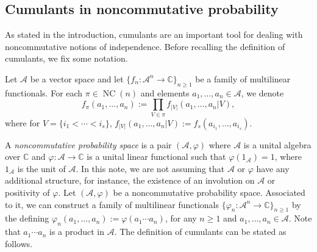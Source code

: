 \documentclass[pdftex]{sigma}%
\numberwithin{equation}{section}
\newcommand{\A}{\mathcal{A}}
\newcommand{\NC}{\operatorname{NC}}
\begin{document}
\subsection{Cumulants in noncommutative probability}\label{sec:cumulants}

As stated in the introduction, cumulants are an important tool for dealing with noncommutative notions of independence. Before recalling the definition of cumulants, we fix some notation.
\begin{Definition}
 Let $\A$ be a vector space and let $\{f_n\colon \A^n \to \mathbb{C}\}_{n\geq1}$ be a family of multilinear functionals. For each $\pi \in \NC(n)$ and elements $a_1,\dots,a_n \in \A$, we denote{\samepage
\[
	f_{\pi}(a_1,\dots,a_n) := \prod_{V \in \pi} f_{|V|}(a_1,\dots,a_n | V),
\]
where for $V = \{i_1 < \cdots < i_s\}$, $f_{|V|}(a_1,\dots,a_n|V) := f_s(a_{i_1},\dots,a_{i_s})$.}
\end{Definition}
A \textit{noncommutative probability space} is a pair $(\A,\varphi)$ where $\A$ is a unital algebra over $\mathbb{C}$ and $\varphi\colon \A\to \mathbb{C}$ is a unital linear functional such that $\varphi(1_\A)=1$, where $1_\A$ is the unit of $\A$. In this note, we are not assuming that $\A$ or $\varphi$ have any additional structure, for instance, the existence of an involution on $\A$ or positivity of $\varphi$.
Let $(\A,\varphi)$ be a noncommutative probability space. Associated to it, we can construct a family of multilinear functionals $\{\varphi_n\colon \A^n\to\mathbb{C}\}_{n\geq 1}$ by the defining $\varphi_n(a_1,\dots,a_n) := \varphi(a_1\cdots a_n)$, for any $n\geq1$ and $a_1,\dots,a_n\in \A$. Note that $a_1\cdots a_n$ is a product in $\A$. The definition of cumulants can be stated as follows.
\end{document}
